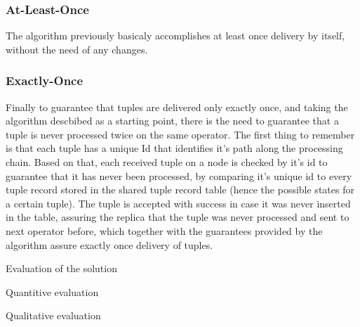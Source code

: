 \documentclass[times, 10pt,twocolumn]{article}
\begin{document}
\subsubsection{At-Least-Once}

The algorithm previously basicaly accomplishes at least once
delivery by itself, without the need of any changes. 

\subsubsection{Exactly-Once}

Finally to guarantee that tuples are delivered only exactly once, and taking
the algorithm descbibed as a starting point, there is the need to guarantee
that a tuple is never processed twice on the same operator. The first thing
to remember is that each tuple has a unique Id that identifies it's path
along the processing chain. Based on that, each received tuple on a node is
checked by it's id to guarantee that it has never been processed, by comparing
it's unique id to every tuple record stored in the shared tuple record table
(hence the possible states for a certain tuple).
The tuple is accepted with success in case it was never inserted in the table,
assuring the replica that the tuple was never processed and sent to next
operator before, which together with the guarantees provided by the algorithm
assure exactly once delivery of tuples.


Evaluation of the solution


Quantitive evaluation


Qualitative evaluation

\end{document}
